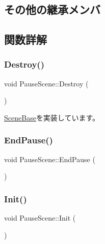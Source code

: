 \subsection*{その他の継承メンバ}


\subsection{関数詳解}
\mbox{\label{class_pause_scene_a1ff30a4006f7b93f13305b270bc0d913}} 
\subsubsection{\texorpdfstring{Destroy()}{Destroy()}}
{\footnotesize\ttfamily void Pause\+Scene\+::\+Destroy (\begin{DoxyParamCaption}{ }\end{DoxyParamCaption})\hspace{0.3cm}{\ttfamily [virtual]}}



\mbox{\hyperlink{class_scene_base_a7c5b54020bc519b4dadfe9770d6b27f7}{Scene\+Base}}を実装しています。

\mbox{\label{class_pause_scene_a894f114f5398caf802eaad77826b7b2c}} 
\subsubsection{\texorpdfstring{End\+Pause()}{EndPause()}}
{\footnotesize\ttfamily void Pause\+Scene\+::\+End\+Pause (\begin{DoxyParamCaption}{ }\end{DoxyParamCaption})\hspace{0.3cm}{\ttfamily [inline]}}

\mbox{\label{class_pause_scene_ad2df77966e0ac9ef6dfa99e416498183}} 
\subsubsection{\texorpdfstring{Init()}{Init()}}
{\footnotesize\ttfamily void Pause\+Scene\+::\+Init (\begin{DoxyParamCaption}{ }\end{DoxyParamCaption})\hspace{0.3cm}{\ttfamily [virtual]}}




